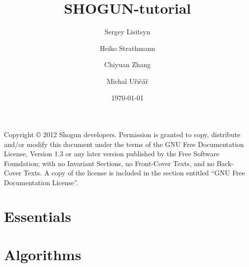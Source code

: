 \documentclass{shogun_tutorial}
\title{SHOGUN-tutorial}
\date{\today}
\author
{
Sergey Lisitsyn \and
Heiko Strathmann \and
Chiyuan Zhang \and
Michal U\v{r}i\v{c}\'{a}\v{r} \and
}
\begin{document}
	\maketitle
	Copyright \copyright{}  2012 Shogun developers.
    Permission is granted to copy, distribute and/or modify this document
    under the terms of the GNU Free Documentation License, Version 1.3
    or any later version published by the Free Software Foundation;
    with no Invariant Sections, no Front-Cover Texts, and no Back-Cover Texts.
    A copy of the license is included in the section entitled ``GNU
    Free Documentation License''.


	\tableofcontents
	\listoftodos
	\part{Essentials}
	
	\part{Algorithms}
	
	
	
	


	\begin{appendix}
	
	\end{appendix}

	
	
\end{document}
